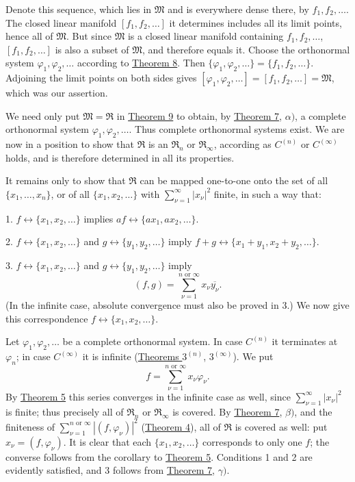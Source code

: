 \documentclass[fontsize=13pt,twoside,openany,headings=normal,parskip=false,bookmarkpackage=false,DIV=calc]{scrbook}
\begin{document}
Denote this sequence, which lies in $\mathfrak{M}$ and is everywhere dense there, by $f_1,f_2,\ldots$. The closed linear manifold $[f_1,f_2,\ldots]$ it determines includes all its limit points, hence all of $\mathfrak{M}$. But since $\mathfrak{M}$ is a closed linear manifold containing $f_1,f_2,\ldots$, $[f_1,f_2,\ldots]$ is also a subset of $\mathfrak{M}$, and therefore equals it. Choose the orthonormal system $\varphi_1,\varphi_2,\ldots$ according to \hyperref[thm:II.8]{Theorem 8}. Then $\{\varphi_1,\varphi_2,\ldots\}=\{f_1,f_2,\ldots\}$. Adjoining the limit points on both sides gives $[\varphi_1,\varphi_2,\ldots]=[f_1,f_2,\ldots]=\mathfrak{M}$, which was our assertion.

We need only put $\mathfrak{M}=\mathfrak{R}$ in \hyperref[thm:II.9]{Theorem 9} to obtain, by \hyperref[thm:II.7]{Theorem 7}, $\alpha)$, a complete orthonormal system $\varphi_1,\varphi_2,\ldots$. Thus complete orthonormal systems exist. We are now in a position to show that $\mathfrak{R}$ is an $\mathfrak{R}_n$ or $\mathfrak{R}_\infty$, according as \hyperref[ax:II.Cn]{$C^{(n)}$} or \hyperref[ax:II.Cinfty]{$C^{(\infty)}$} holds, and is therefore determined in all its properties.

It remains only to show that $\mathfrak{R}$ can be mapped one-to-one onto the set of all $\{x_1,\ldots,x_n\}$, or of all $\{x_1,x_2,\ldots\}$ with $\sum_{\nu=1}^\infty|x_\nu|^2$ finite, in such a way that:

1. $f\longleftrightarrow\{x_1,x_2,\ldots\}$ implies $af\longleftrightarrow\{ax_1,ax_2,\ldots\}$.

2. $f\longleftrightarrow\{x_1,x_2,\ldots\}$ and $g\longleftrightarrow\{y_1,y_2,\ldots\}$ imply $f+g\longleftrightarrow\{x_1+y_1,x_2+y_2,\ldots\}$.

\hypertarget{origpage-31}{}%
3. $f\longleftrightarrow\{x_1,x_2,\ldots\}$ and $g\longleftrightarrow\{y_1,y_2,\ldots\}$ imply
\[
(f,g)=\sum_{\nu=1}^{n\text{ or }\infty}x_\nu\overline{y_\nu}.
\]
(In the infinite case, absolute convergence must also be proved in 3.) We now give this correspondence $f\longleftrightarrow\{x_1,x_2,\ldots\}$.

Let $\varphi_1,\varphi_2,\ldots$ be a complete orthonormal system. In case \hyperref[ax:II.Cn]{$C^{(n)}$} it terminates at $\varphi_n$; in case \hyperref[ax:II.Cinfty]{$C^{(\infty)}$} it is infinite (\hyperref[thm:II.3n]{Theorems $3^{(n)}$}, \hyperref[thm:II.3infty]{$3^{(\infty)}$}). We put
\[
f=\sum_{\nu=1}^{n\text{ or }\infty}x_\nu\varphi_\nu.
\]
By \hyperref[thm:II.5]{Theorem 5} this series converges in the infinite case as well, since $\sum_{\nu=1}^\infty|x_\nu|^2$ is finite; thus precisely all of $\mathfrak{R}_n$ or $\mathfrak{R}_\infty$ is covered. By \hyperref[thm:II.7]{Theorem 7}, $\beta)$, and the finiteness of $\sum_{\nu=1}^{n\text{ or }\infty}|(f,\varphi_\nu)|^2$ (\hyperref[thm:II.4]{Theorem 4}), all of $\mathfrak{R}$ is covered as well: put $x_\nu=(f,\varphi_\nu)$. It is clear that each $\{x_1,x_2,\ldots\}$ corresponds to only one $f$; the converse follows from the corollary to \hyperref[thm:II.5]{Theorem 5}. Conditions 1 and 2 are evidently satisfied, and 3 follows from \hyperref[thm:II.7]{Theorem 7}, $\gamma)$.
\end{document}
